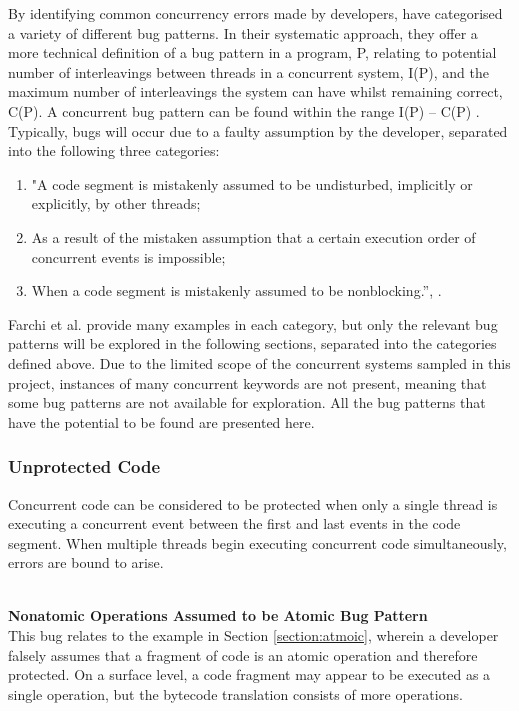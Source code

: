 \documentclass[a4paper,12pt]{article}
\begin{document}
By identifying common concurrency errors made by developers, \citet{farchi03} have categorised a variety of different bug patterns. In their systematic approach, they offer a more technical definition of a bug pattern in a program, P, relating to potential number of interleavings between threads in a concurrent system, I(P), and the maximum number of interleavings the system can have whilst remaining correct, C(P). A concurrent bug pattern can be found within the range I(P) – C(P) \citet{farchi03}. Typically, bugs will occur due to a faulty assumption by the developer, separated into the following three categories: 

\begin{enumerate}
    \item "A code segment is mistakenly assumed to be undisturbed, implicitly or explicitly, by other threads;
    \item As a result of the mistaken assumption that a certain execution order of concurrent events is impossible;
    \item When a code segment is mistakenly assumed to be nonblocking.”, \citep{farchi03}.
\end{enumerate}

Farchi et al. provide many examples in each category, but only the relevant bug patterns will be explored in the following sections, separated into the categories defined above. Due to the limited scope of the concurrent systems sampled in this project, instances of many concurrent keywords are not present, meaning that some bug patterns are not available for exploration. All the bug patterns that have the potential to be found are presented here.        

    
\subsubsection{Unprotected Code}
Concurrent code can be considered to be protected when only a single thread is executing a concurrent event between the first and last events in the code segment. When multiple threads begin executing concurrent code simultaneously, errors are bound to arise.   

\textbf{\\Nonatomic Operations Assumed to be Atomic Bug Pattern} 
\\This bug relates to the example in Section \ref{section:atmoic}, wherein a developer falsely assumes that a fragment of code is an atomic operation and therefore protected. On a surface level, a code fragment may appear to be executed as a single operation, but the bytecode translation consists of more operations.
\end{document}
